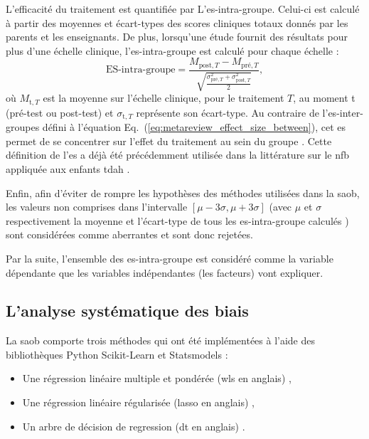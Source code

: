 L'efficacité du traitement est quantifiée par L'\gls{es}-intra-groupe. Celui-ci est calculé à partir des moyennes et écart-types des scores 
cliniques totaux donnés par les parents et les enseignants. De plus, lorsqu'une étude 
fournit des résultats pour plus d'une échelle clinique, l'\gls{es}-intra-groupe est calculé pour chaque échelle :
\begin{equation}
\label{eq:factors_effect_size_within_subject}
\text{ES-intra-groupe} = \frac{M_{\text{post},T} - M_{\text{pré},T}}{\sqrt{\frac{\sigma_{\text{pré},T}^2 + \sigma_{\text{post},T}^2}{2}}},
\end{equation} 
\noindent où $M_{\text{t},T}$ est la moyenne sur l'échelle clinique, pour le traitement $T$, au moment t (pré-test ou post-test) et $\sigma_{\text{t},T}$ représente
son écart-type. Au contraire de l'\gls{es}-inter-groupes défini à l'équation Eq.~(\ref{eq:metareview_effect_size_between}), cet \gls{es} permet de se concentrer sur l'effet du 
traitement au sein du groupe \citep{Cohen1988}. Cette définition de l'\gls{es} a déjà été précédemment utilisée dans la littérature sur le \gls{nfb} 
appliquée aux enfants \gls{tdah} \citep{Arns2009, Maurizio2014, Strehl2017}. 

Enfin, afin d'éviter de rompre les hypothèses des méthodes utilisées dans la \gls{saob}, les valeurs non comprises dans l'intervalle 
$[\mu - 3 \sigma, \mu + 3 \sigma]$ (avec $\mu$ et $\sigma$ respectivement la moyenne et l'écart-type de tous les \gls{es}-intra-groupe calculés \citep{Shewhart1931})
sont considérées comme aberrantes et sont donc rejetées.

Par la suite, l'ensemble des \gls{es}-intra-groupe est considéré comme la variable dépendante que les variables indépendantes (les facteurs) vont expliquer. 

\subsection{L'analyse systématique des biais}

La \gls{saob} comporte trois méthodes qui ont été implémentées à l'aide des bibliothèques Python Scikit-Learn \citep[version 0.18.1]{Pedregosa2011} et Statsmodels \citep[version 0.8.0]{Seabold2010} : 
\begin{itemize}
  \item Une régression linéaire multiple et pondérée (\gls{wls} en anglais) \citep{Montgomery2012},
	\item Une régression linéaire régularisée (\gls{lasso} en anglais) \citep{Tibshirani1996},
	\item Un arbre de décision de regression (\gls{dt} en anglais) \citep{Quinlan1986}.
\end{itemize}

